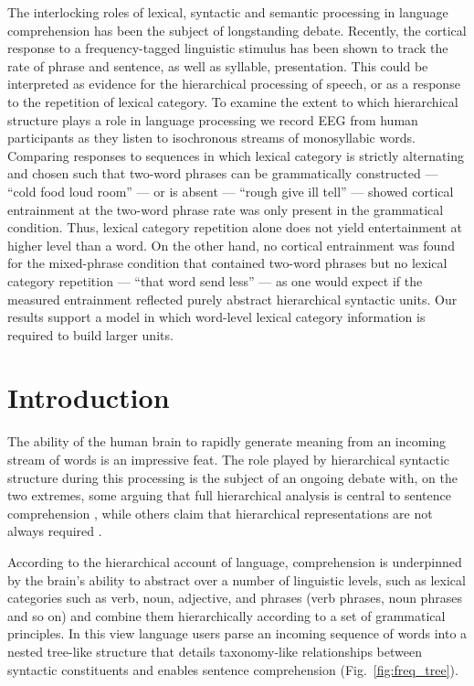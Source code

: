 \documentclass[10pt,letterpaper]{article}
\newcommand{\citet}[1]{\cite{#1}}
\begin{document}
The interlocking roles of lexical, syntactic and semantic processing
in language comprehension has been the subject of longstanding
debate. Recently, the cortical response to a frequency-tagged
linguistic stimulus has been shown to track the rate of phrase and
sentence, as well as syllable, presentation. This could be interpreted
as evidence for the hierarchical processing of speech, or as a
response to the repetition of lexical category. To examine the extent
to which hierarchical structure plays a role in language processing we
record EEG from human participants as they listen to isochronous
streams of monosyllabic words. Comparing responses to sequences in
which lexical category is strictly alternating and chosen such that
two-word phrases can be grammatically constructed --- ``cold food loud
room'' --- or is absent --- ``rough give ill tell'' --- showed
cortical entrainment at the two-word phrase rate was only present in
the grammatical condition. Thus, lexical category repetition alone
does not yield entertainment at higher level than a word. On the other
hand, no cortical entrainment was found for the mixed-phrase condition
that contained two-word phrases but no lexical category repetition ---
``that word send less'' --- as one would expect if the measured
entrainment reflected purely abstract hierarchical syntactic
units. Our results support a model in which word-level lexical
category information is required to build larger units.


\section*{Introduction}

The ability of the human brain to rapidly generate meaning from an
incoming stream of words is an impressive feat. The role played by
hierarchical syntactic structure during this processing is the subject
of an ongoing debate with, on the two extremes, some arguing that full
hierarchical analysis is central to sentence comprehension
\citet{Chomsky1995,BerwickEtAl2013, EveraertEtAl2015}, while others
claim that hierarchical representations are not always required
\cite{FrankEtAl2012, FrankBod2011, FrankYang2018,
  FrankChristiansen2018}.

According to the hierarchical account of language, comprehension is
underpinned by the brain's ability to abstract over a number of
linguistic levels, such as lexical categories such as verb, noun,
adjective, and phrases (verb phrases, noun phrases and so on) and
combine them hierarchically according to a set of grammatical
principles. In this view language users parse an incoming sequence of
words into a nested tree-like structure that details taxonomy-like
relationships between syntactic constituents and enables sentence
comprehension (Fig.~\ref{fig:freq_tree}).
\end{document}
